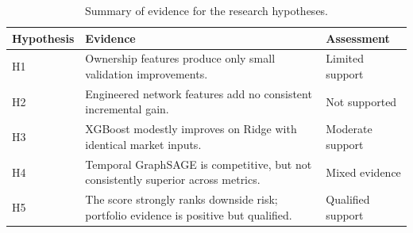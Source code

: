\begin{table}[!htbp]
\centering
\footnotesize
\caption{Summary of evidence for the research hypotheses.}
\label{tab:hypothesis-summary}
\begin{tabular}{lp{}l}
\toprule
Hypothesis & Evidence & Assessment \\
\midrule
H1 & Ownership features produce only small validation improvements. & Limited support \\
H2 & Engineered network features add no consistent incremental gain. & Not supported \\
H3 & XGBoost modestly improves on Ridge with identical market inputs. & Moderate support \\
H4 & Temporal GraphSAGE is competitive, but not consistently superior across metrics. & Mixed evidence \\
H5 & The score strongly ranks downside risk; portfolio evidence is positive but qualified. & Qualified support \\
\bottomrule
\end{tabular}
\end{table}
